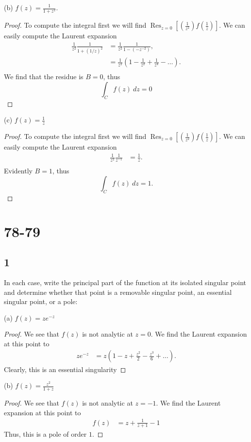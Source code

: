 \documentclass{article}
\DeclareMathOperator*{\Res}{Res}
\begin{document}
(b) $f(z) = \frac{1}{1 + z^2}$.
\begin{proof}
    To compute the integral first we will find
    ${\Res_{z=0}[(\frac{1}{z^2})f(\frac{1}{z})]}$. We can easily compute the
    Laurent expansion
    \begin{align*}
        \frac{1}{z^2}\frac{1}{1 + (1/z)^2} & = \frac{1}{z^2}\frac{1}{1 - (-z^{-2})},                     \\
                                           & = \frac{1}{z^2}(1 - \frac{1}{z^2} + \frac{1}{z^4} - \dots). \\
    \end{align*}
    We find that the residue is $B = 0 $, thus
    \[\int_C f(z) \ dz = 0\]
\end{proof}

(c) $f(z) = \frac{1}{z}$
\begin{proof}
    To compute the integral first we will find
    ${\Res_{z=0}[(\frac{1}{z^2})f(\frac{1}{z})]}$. We can easily compute the
    Laurent expansion
    \begin{align*}
        \frac{1}{z^2}\frac{1}{z^{-1}} & = \frac{1}{z}. \\
    \end{align*}
    Evidently $B = 1$, thus
    \[\int_C f(z) \ dz = 1.\]
\end{proof}


\section*{78-79}
\subsection*{1}
In each case, write the principal part of the function at its isolated singular point
and determine whether that point is a removable singular point, an essential
singular point, or a pole:

(a) $f(z) = ze^{-z}$
\begin{proof}
    We see that $f(z)$ is not analytic at $z = 0$. We find the Laurent expansion
    at this point to
    \begin{align*}
        ze^{-z} & = z(1 - z + \frac{z^2}{2} - \frac{z^3}{6} + \dots).
    \end{align*}
    Clearly, this is an essential singularity
\end{proof}

(b) $f(z) = \frac{z^2}{1 + z}$
\begin{proof}
    We see that $f(z)$ is not analytic at $z = -1$. We find the Laurent expansion
    at this point to
    \begin{align*}
        f(z) & = z + \frac{1}{z + 1} - 1
    \end{align*}
    Thus, this is a pole of order $1$.
\end{proof}
\end{document}
